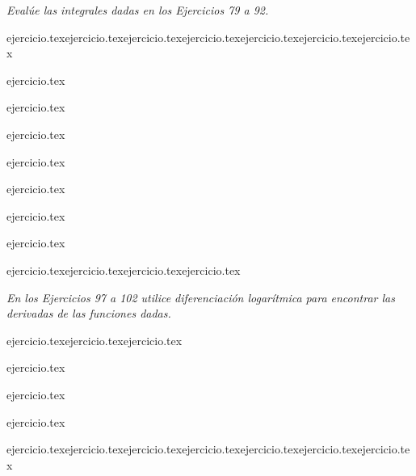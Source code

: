 \vspace{1em}
\noindent \textit{Evalúe las integrales dadas en los Ejercicios 79 a 92.}

\begin{enumerate}
    \setcounter{enumi}{78}
    \begin{minipage}{0.45\textwidth}
    {ejercicio.tex}{ejercicio.tex}{ejercicio.tex}{ejercicio.tex}{ejercicio.tex}{ejercicio.tex}{ejercicio.tex}\end{minipage}%
    \begin{minipage}{0.45\textwidth}
    \setcounter{enumi}{79}
    {ejercicio.tex}\addtocounter{enumi}{1}
    {ejercicio.tex}\addtocounter{enumi}{1}
    {ejercicio.tex}\addtocounter{enumi}{1}
    {ejercicio.tex}\addtocounter{enumi}{1}
    {ejercicio.tex}\addtocounter{enumi}{1}
    {ejercicio.tex}\addtocounter{enumi}{1}
    {ejercicio.tex}\end{minipage}
\end{enumerate}

\vspace{1em}
\begin{enumerate}
    \setcounter{enumi}{92}
    {ejercicio.tex}{ejercicio.tex}{ejercicio.tex}{ejercicio.tex}\end{enumerate}

\vspace{1em}
\noindent \textit{En los Ejercicios 97 a 102 utilice diferenciación logarítmica para encontrar las derivadas de las funciones dadas.}

\begin{enumerate}
    \setcounter{enumi}{96}
    \begin{minipage}{0.45\textwidth}
    {ejercicio.tex}{ejercicio.tex}{ejercicio.tex}\end{minipage}%
    \begin{minipage}{0.45\textwidth}
    \setcounter{enumi}{97}
    {ejercicio.tex}\addtocounter{enumi}{1}
    {ejercicio.tex}\addtocounter{enumi}{1}
    {ejercicio.tex}\end{minipage}
\end{enumerate}

\vspace{1em}
\begin{enumerate}
    \setcounter{enumi}{102}
    {ejercicio.tex}{ejercicio.tex}{ejercicio.tex}{ejercicio.tex}{ejercicio.tex}{ejercicio.tex}{ejercicio.tex}\end{enumerate}